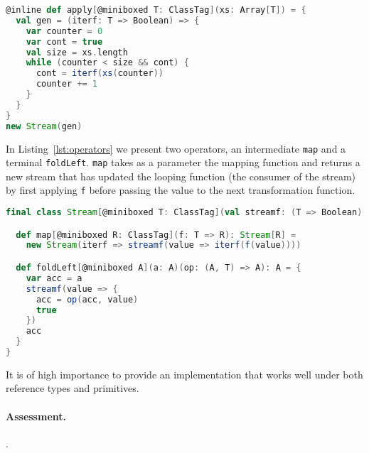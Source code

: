 \begin{lstlisting}[language=scala, caption=Creation of a stream.]
@inline def apply[@miniboxed T: ClassTag](xs: Array[T]) = {
  val gen = (iterf: T => Boolean) => {
    var counter = 0
    var cont = true
    val size = xs.length
    while (counter < size && cont) {
      cont = iterf(xs(counter))
      counter += 1
    }
  }
}
new Stream(gen)
\end{lstlisting}
In Listing~\ref{lst:operators} we present two operators, an intermediate
\verb|map| and a terminal \verb|foldLeft|. \verb|map| takes as a parameter the
mapping function and returns a new stream that has updated the looping function
(the consumer of the stream) by first applying \verb|f| before passing the value
to the next transformation function.
\begin{lstlisting}[language=scala, label=lst:operators, caption=Sample operators.]
final class Stream[@miniboxed T: ClassTag](val streamf: (T => Boolean) => Unit) {

  def map[@miniboxed R: ClassTag](f: T => R): Stream[R] = 
    new Stream(iterf => streamf(value => iterf(f(value))))

  def foldLeft[@miniboxed A](a: A)(op: (A, T) => A): A = {
    var acc = a
    streamf(value => {
      acc = op(acc, value)
      true
    })
    acc
  }
}
\end{lstlisting}
It is of high importance to provide an implementation that works well under both
reference types and primitives.  
\paragraph{Assessment. } .
